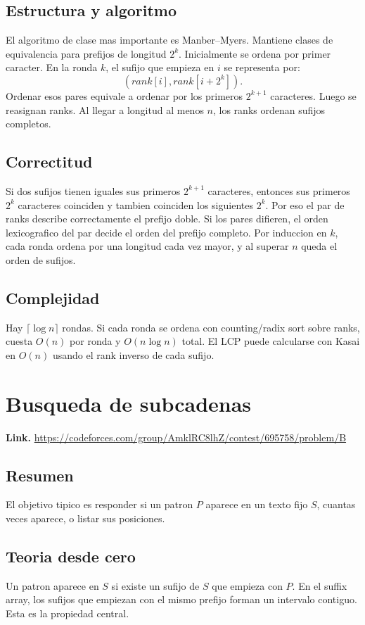 \documentclass[10pt]{article}
\newcommand{\bigO}{O}
\begin{document}
\subsection*{Estructura y algoritmo}
El algoritmo de clase mas importante es Manber--Myers. Mantiene clases de
equivalencia para prefijos de longitud $2^k$. Inicialmente se ordena por primer
caracter. En la ronda $k$, el sufijo que empieza en $i$ se representa por:
\[
(rank[i], rank[i+2^k]).
\]
Ordenar esos pares equivale a ordenar por los primeros $2^{k+1}$ caracteres.
Luego se reasignan ranks. Al llegar a longitud al menos $n$, los ranks ordenan
sufijos completos.

\subsection*{Correctitud}
Si dos sufijos tienen iguales sus primeros $2^{k+1}$ caracteres, entonces sus
primeros $2^k$ caracteres coinciden y tambien coinciden los siguientes $2^k$.
Por eso el par de ranks describe correctamente el prefijo doble. Si los pares
difieren, el orden lexicografico del par decide el orden del prefijo completo.
Por induccion en $k$, cada ronda ordena por una longitud cada vez mayor, y al
superar $n$ queda el orden de sufijos.

\subsection*{Complejidad}
Hay $\lceil\log n\rceil$ rondas. Si cada ronda se ordena con counting/radix sort
sobre ranks, cuesta $\bigO(n)$ por ronda y $\bigO(n\log n)$ total. El LCP puede
calcularse con Kasai en $\bigO(n)$ usando el rank inverso de cada sufijo.

\clearpage
\section{Busqueda de subcadenas}
\textbf{Link.} \url{https://codeforces.com/group/AmklRC8lhZ/contest/695758/problem/B}

\subsection*{Resumen}
El objetivo tipico es responder si un patron $P$ aparece en un texto fijo $S$,
cuantas veces aparece, o listar sus posiciones.

\subsection*{Teoria desde cero}
Un patron aparece en $S$ si existe un sufijo de $S$ que empieza con $P$. En el
suffix array, los sufijos que empiezan con el mismo prefijo forman un intervalo
contiguo. Esta es la propiedad central.
\end{document}

